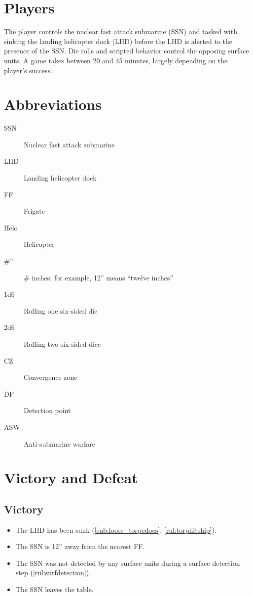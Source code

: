 \documentclass[../TacSubMicroRules.tex]{subfiles}
\begin{document}
\section{Players}%
\label{sec:players}

The player controls the nuclear fast attack submarine (SSN) and tasked with sinking the landing helicopter dock (LHD) before the LHD is alerted to the presence of the SSN.
Die rolls and scripted behavior control the opposing surface units.
A game takes between 20 and 45 minutes, largely depending on the player's success.

\section{Abbreviations}%
\label{sec:abbreviations_and_nomenclature}

\begin{description}
    \item[SSN] Nuclear fast attack submarine
    \item[LHD] Landing helicopter dock
    \item[FF] Frigate
    \item[Helo] Helicopter
    \item[\#''] \# inches; for example, 12'' means ``twelve inches''
    \item[1d6] Rolling one six-sided die
    \item[2d6] Rolling two six-sided dice
    \item[CZ] Convergence zone
    \item[DP] Detection point
    \item[ASW] Anti-submarine warfare
\end{description}

\section{Victory and Defeat}%
\label{sec:victory_and_defeat}


\subsection{Victory}%
\label{sub:victory}

\begin{itemize}
    \item The LHD has been sunk (\ref{sub:loose_torpedoes}, \ref{rul:torphitship}).
    \item The SSN is 12'' away from the nearest FF.
    \item The SSN was not detected by any surface units during a surface detection step (\ref{rul:surfdetection}).
    \item The SSN leaves the table.
\end{itemize}
\end{document}
